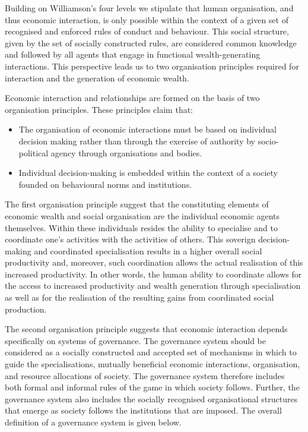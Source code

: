 Building on Williamson's four levels we stipulate that human organisation, and thus economic interaction, is only possible within the context of a given set of recognised and enforced rules of conduct and behaviour. This social structure, given by the set of socially constructed rules, are considered common knowledge and followed by all agents that engage in functional wealth-generating interactions. This perspective leads us to two organisation principles required for interaction and the generation of economic wealth. 
\begin{hypothesis} \label{hyp:organisationPrinciples}
Economic interaction and relationships are formed on the basis of two organisation principles. These principles claim that:
\begin{itemize}
\item The organisation of economic interactions must be based on individual decision making rather than through the exercise of authority by socio-political agency through organisations and bodies. 
\item Individual decision-making is embedded within the context of a society founded on behavioural norms and institutions.
\end{itemize}
\end{hypothesis}
The first organisation principle suggest that the constituting elements of economic wealth and social organisation are the individual economic agents themselves. Within these individuals resides the ability to specialise and to coordinate one's activities with the activities of others. This soverign decision-making and coordinated specialisation results in a higher overall social productivity and, moreover, such coordination allows the actual realisation of this increased productivity. In other words, the human ability to coordinate allows for the access to increased productivity and wealth generation through specialisation as well as for the realisation of the resulting gains from coordinated social production.

The second organisation principle suggests that economic interaction depends specifically on systems of governance. The governance system should be considered as a socially constructed and accepted set of mechanisms in which to guide the specialisations, mutually beneficial economic interactions, organisation, and resource allocations of society. The governance system therefore includes both formal and informal rules of the game in which society follows. Further, the governance system also includes the socially recognised organisational structures that emerge as society follows the institutions that are imposed. The overall definition of a governance system is given below.

